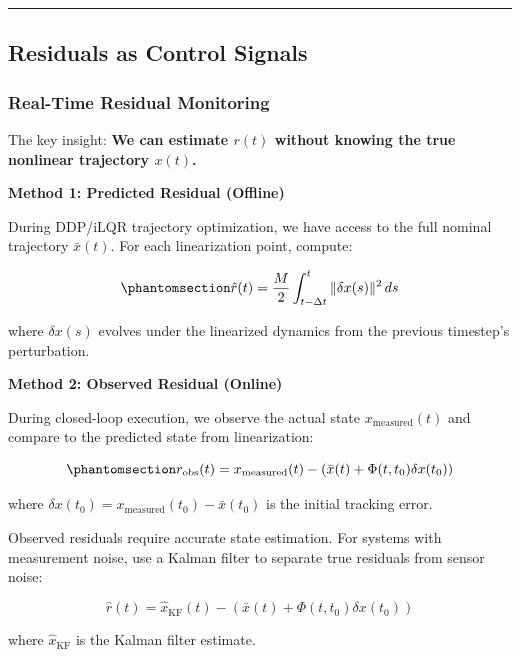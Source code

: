 \documentclass[
  letterpaper,
  DIV=11,
  numbers=noendperiod]{scrartcl}
\begin{document}
\begin{center}\rule{0.5\linewidth}{0.5pt}\end{center}

\subsection{Residuals as Control Signals}\label{sec-control-signals}

\subsubsection{Real-Time Residual
Monitoring}\label{real-time-residual-monitoring}

The key insight: \textbf{We can estimate \(r(t)\) without knowing the
true nonlinear trajectory \(x(t)\).}

\textbf{Method 1: Predicted Residual (Offline)}

During DDP/iLQR trajectory optimization, we have access to the full
nominal trajectory \(\bar{x}(t)\). For each linearization point,
compute:

\begin{equation}\phantomsection\label{eq-predicted-residual}{
\hat{r}(t) = \frac{M}{2} \int_{t-\Delta t}^{t} \|\delta x(s)\|^2 \, ds
}\end{equation}

where \(\delta x(s)\) evolves under the linearized dynamics from the
previous timestep's perturbation.

\textbf{Method 2: Observed Residual (Online)}

During closed-loop execution, we observe the actual state
\(x_{\text{measured}}(t)\) and compare to the predicted state from
linearization:

\begin{equation}\phantomsection\label{eq-observed-residual}{
r_{\text{obs}}(t) = x_{\text{measured}}(t) - \left( \bar{x}(t) + \Phi(t, t_0) \delta x(t_0) \right)
}\end{equation}

where \(\delta x(t_0) = x_{\text{measured}}(t_0) - \bar{x}(t_0)\) is the
initial tracking error.

\begin{tcolorbox}[enhanced jigsaw, breakable, bottomtitle=1mm, title=\textcolor{quarto-callout-warning-color}{\faExclamationTriangle}\hspace{0.5em}{State Estimation}, opacityback=0, left=2mm, titlerule=0mm, colframe=quarto-callout-warning-color-frame, opacitybacktitle=0.6, bottomrule=.15mm, toptitle=1mm, toprule=.15mm, arc=.35mm, leftrule=.75mm, rightrule=.15mm, colback=white, colbacktitle=quarto-callout-warning-color!10!white, coltitle=black]

Observed residuals require accurate state estimation. For systems with
measurement noise, use a Kalman filter to separate true residuals from
sensor noise:

\[
\hat{r}(t) = \hat{x}_{\text{KF}}(t) - (\bar{x}(t) + \Phi(t, t_0) \delta x(t_0))
\]

where \(\hat{x}_{\text{KF}}\) is the Kalman filter estimate.

\end{tcolorbox}
\end{document}

